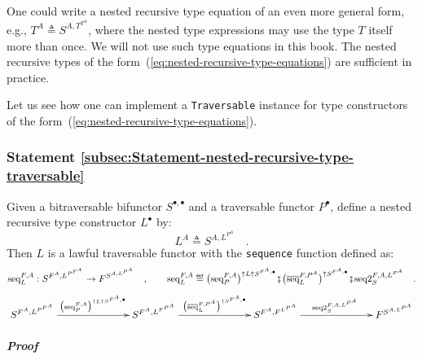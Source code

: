 One could write a nested recursive type equation of an even more general
form, e.g., $T^{A}\triangleq S^{A,T^{T^{A}}}$, where the nested type
expressions may use the type $T$ itself more than once. We will not
use such type equations in this book. The nested recursive types of
the form~(\ref{eq:nested-recursive-type-equations}) are sufficient
in practice.

Let us see how one can implement a \lstinline!Traversable! instance
for type constructors of the form~(\ref{eq:nested-recursive-type-equations}).

\subsubsection{Statement \label{subsec:Statement-nested-recursive-type-traversable}\ref{subsec:Statement-nested-recursive-type-traversable}}

Given a bitraversable bifunctor $S^{\bullet,\bullet}$ and a traversable
functor $P^{\bullet}$, define a nested recursive type constructor
$L^{\bullet}$ by:
\[
L^{A}\triangleq S^{A,L^{P^{A}}}\quad.
\]
Then $L$ is a lawful traversable functor with the \lstinline!sequence!
function defined as:
\[
\text{seq}_{L}^{F,A}:S^{F^{A},L^{P^{F^{A}}}}\rightarrow F^{S^{A,L^{P^{A}}}}\quad,\quad\quad\text{seq}_{L}^{F,A}\triangleq\big(\text{seq}_{P}^{F,A}\big)^{\uparrow L\uparrow S^{F^{A},\bullet}}\bef\big(\overline{\text{seq}}_{L}^{F,P^{A}}\big)^{\uparrow S^{F^{A},\bullet}}\bef\text{seq2}_{S}^{F,A,L^{P^{A}}}\quad.
\]
\vspace{-1\baselineskip}
\[
\xymatrix{\xyScaleY{1.4pc}\xyScaleX{6pc}S^{F^{A},L^{P^{F^{A}}}}\ar[r]\sp(0.5){\big(\text{seq}_{P}^{F,A}\big)^{\uparrow L\uparrow S^{F^{A},\bullet}}} & S^{F^{A},L^{F^{P^{A}}}}\ar[r]\sp(0.5){\big(\overline{\text{seq}}_{L}^{F,P^{A}}\big)^{\uparrow S^{F^{A},\bullet}}} & S^{F^{A},F^{L^{P^{A}}}}\ar[r]\sp(0.5){\text{seq2}_{S}^{F,A,L^{P^{A}}}} & F^{S^{A,L^{P^{A}}}}}
\]
\vspace{-1\baselineskip}


\subparagraph{Proof}

